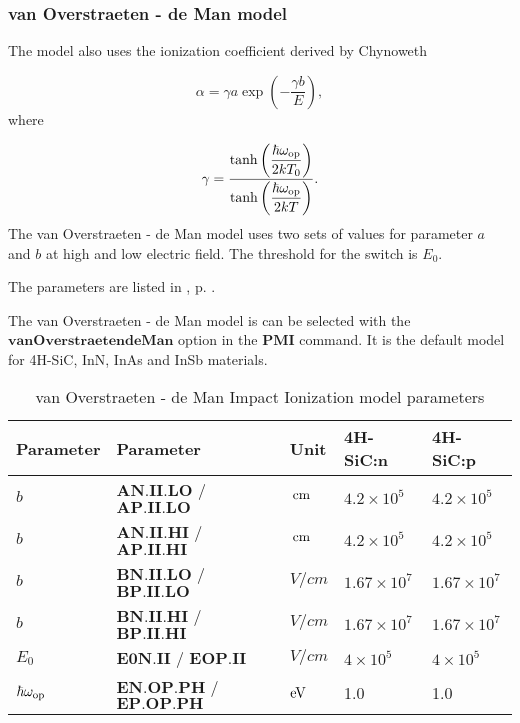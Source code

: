\documentclass[oneside,12pt]{cgd_book}
\begin{document}
\subsubsection{van Overstraeten - de Man model}
The model also uses the ionization coefficient derived by Chynoweth
\cite[Chynoweth1958]{}
\par
\begin{equation}
\alpha = \gamma a \exp \left( -\frac{ \gamma b }{ E } \right),
\end{equation}
where
\par
\begin{equation}
\gamma = \dfrac{\tanh \left(\dfrac{\hbar\omega_{\rm op} }{2kT_0} \right) } { \tanh \left(
            \dfrac{\hbar\omega_{\rm op}}{2kT} \right) }.
\end{equation}
The van Overstraeten - de Man model uses two sets of values for parameter
$a$ and $b$ at high and low electric field. The threshold for
          the switch is $E_0$.
\par
The parameters are listed in ,
p. \pageref{tab:Equation:II:Overstraeten:Param}.
\par
The van Overstraeten - de Man model is can be selected with the
$\mathbf{vanOverstraetendeMan}$ option in the $\mathbf{PMI}$ command. It is the default
          model for 4H-SiC, InN, InAs and InSb materials.
\par
\begin{longtable}{lllll}
\caption{\label{tab:Equation:II:Overstraeten:Param}van Overstraeten - de Man Impact Ionization model parameters}\\
\hline
 Parameter
& Parameter
& Unit
& 4H-SiC:n
& 4H-SiC:p\\
\hline
 $b$
& $\mathbf{AN.II.LO}$ / $\mathbf{AP.II.LO}$
& $\,\text{cm}$
& $4.2\times10^5$
& $4.2\times10^5$
\\
 $b$
& $\mathbf{AN.II.HI}$ / $\mathbf{AP.II.HI}$
& $\,\text{cm}$
& $4.2\times10^5$
& $4.2\times10^5$
\\
 $b$
& $\mathbf{BN.II.LO}$ / $\mathbf{BP.II.LO}$
& $V/cm$
& $1.67\times10^7$
& $1.67\times10^7$
\\
 $b$
& $\mathbf{BN.II.HI}$ / $\mathbf{BP.II.HI}$
& $V/cm$
& $1.67\times10^7$
& $1.67\times10^7$
\\
 $E_0$
& $\mathbf{E0N.II}$ / $\mathbf{EOP.II}$
& $V/cm$
& $4\times10^5$
& $4\times10^5$
\\
 $\hbar\omega_{\rm op}$
& $\mathbf{EN.OP.PH}$ / $\mathbf{EP.OP.PH}$
& $\text{eV}$
& 1.0
& 1.0\\
\end{longtable}
\end{document}
